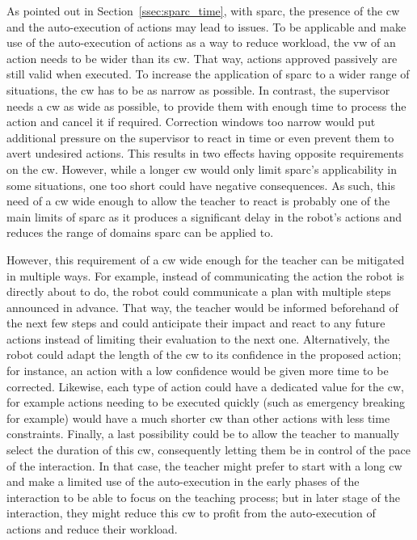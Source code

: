 As pointed out in Section~\ref{ssec:sparc_time}, with \gls{sparc}, the presence of the \gls{cw} and the auto-execution of actions may lead to issues. To be applicable and make use of the auto-execution of actions as a way to reduce workload, the \gls{vw} of an action needs to be wider than its \gls{cw}. That way, actions approved passively are still valid when executed. To increase the application of \gls{sparc} to a wider range of situations, the \gls{cw} has to be as narrow as possible. In contrast, the supervisor needs a \gls{cw} as wide as possible, to provide them with enough time to process the action and cancel it if required. Correction windows too narrow would put additional pressure on the supervisor to react in time or even prevent them to avert undesired actions. 
This results in two effects having opposite requirements on the \gls{cw}. However, while a longer \gls{cw} would only limit \gls{sparc}'s applicability in some situations, one too short could have negative consequences. As such, this need of a \gls{cw} wide enough to allow the teacher to react is probably one of the main limits of \gls{sparc} as it produces a significant delay in the robot's actions and reduces the range of domains \gls{sparc} can be applied to.

However, this requirement of a \gls{cw} wide enough for the teacher can be mitigated in multiple ways. For example, instead of communicating the action the robot is directly about to do, the robot could communicate a plan with multiple steps announced in advance. That way, the teacher would be informed beforehand of the next few steps and could anticipate their impact and react to any future actions instead of limiting their evaluation to the next one. Alternatively, the robot could adapt the length of the \gls{cw} to its confidence in the proposed action; for instance, an action with a low confidence would be given more time to be corrected. Likewise, each type of action could have a dedicated value for the \gls{cw}, for example actions needing to be executed quickly (such as emergency breaking for example) would have a much shorter \gls{cw} than other actions with less time constraints. Finally, a last possibility could be to allow the teacher to manually select the duration of this \gls{cw}, consequently letting them be in control of the pace of the interaction. In that case, the teacher might prefer to start with a long \gls{cw} and make a limited use of the auto-execution in the early phases of the interaction to be able to focus on the teaching process; but in later stage of the interaction, they might reduce this \gls{cw} to profit from the auto-execution of actions and reduce their workload.

